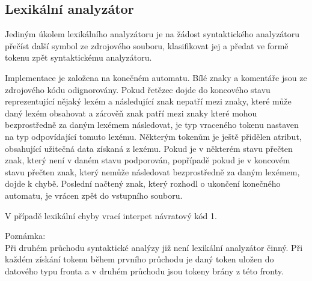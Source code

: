 \documentclass[a4paper, 11pt]{article}
\begin{document}
    \subsection{Lexikální analyzátor}
    Jediným úkolem lexikálního analyzátoru je na žádost syntaktického analyzátoru přečíst další symbol ze zdrojového souboru, klasifikovat jej a předat ve formě tokenu zpět syntaktickému analyzátoru.\par
    Implementace je založena na konečném automatu. Bílé znaky a komentáře jsou ze zdrojového kódu odignorovány. Pokud řetězec dojde do koncového stavu reprezentující nějaký lexém a následující znak nepatří mezi znaky, které může daný lexém obsahovat a zárověň znak patří mezi znaky které mohou bezprostředně za daným lexémem následovat, je typ vraceného tokenu nastaven na typ odpovídající tomuto lexému. Některým tokenům je ještě přidělen atribut, obsahující užitečná data získaná z lexému. Pokud je v některém stavu přečten znak, který není v daném stavu podporován, popřípadě pokud je v koncovém stavu přečten znak, který nemůže následovat bezprostředně za daným lexémem, dojde k chybě. Poslední načtený znak, který rozhodl o ukončení konečného automatu, je vrácen zpět do vstupního souboru.\par
    V případě lexikální chyby vrací interpet návratový kód 1.\par
    {\small Poznámka:\\
    Při druhém průchodu syntaktické analýzy již není lexikální analyzátor činný. Při každém získání tokenu během prvního průchodu je daný token uložen do datového typu fronta a v druhém průchodu jsou tokeny brány z této fronty.}
\end{document}
